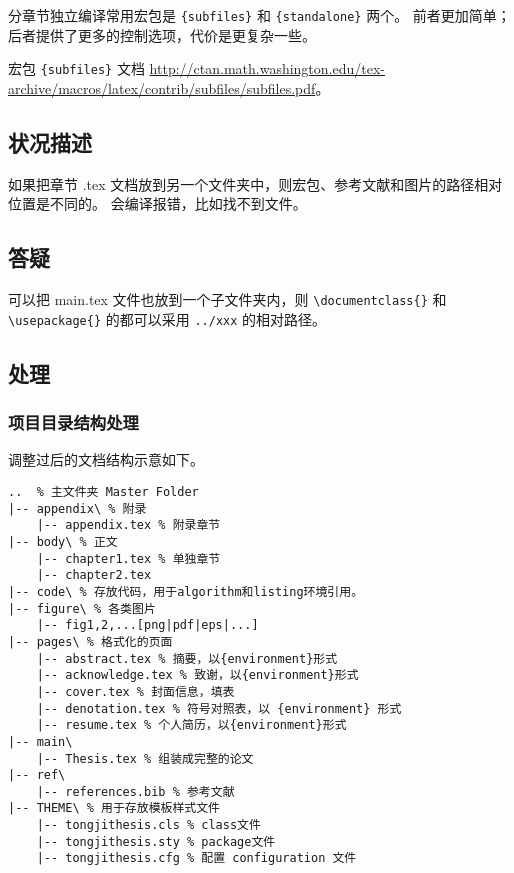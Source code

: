 \documentclass[../Main/thesis.tex]{subfiles}
\begin{document}
分章节独立编译常用宏包是 \texttt{\{subfiles\}} 和 \texttt{\{standalone\}} 两个。
前者更加简单；后者提供了更多的控制选项，代价是更复杂一些。

宏包 \texttt{\{subfiles\}} 文档
\url{http://ctan.math.washington.edu/tex-archive/macros/latex/contrib/subfiles/subfiles.pdf}。

\subsection{状况描述}

如果把章节 .tex 文档放到另一个文件夹中，则宏包、参考文献和图片的路径相对位置是不同的。
会编译报错，比如找不到文件。

\subsection{答疑}

可以把 main.tex 文件也放到一个子文件夹内，则 \texttt{\textbackslash{}documentclass\{\}} 和 \texttt{\textbackslash{}usepackage\{\}} 的都可以采用 \texttt{../xxx} 的相对路径。

\subsection{处理}

\subsubsection{项目目录结构处理}

调整过后的文档结构示意如下。

\begin{verbatim}
..  % 主文件夹 Master Folder
|-- appendix\ % 附录
    |-- appendix.tex % 附录章节
|-- body\ % 正文
    |-- chapter1.tex % 单独章节
    |-- chapter2.tex
|-- code\ % 存放代码，用于algorithm和listing环境引用。
|-- figure\ % 各类图片
    |-- fig1,2,...[png|pdf|eps|...]
|-- pages\ % 格式化的页面
    |-- abstract.tex % 摘要，以{environment}形式
    |-- acknowledge.tex % 致谢，以{environment}形式
    |-- cover.tex % 封面信息，填表
    |-- denotation.tex % 符号对照表，以 {environment} 形式
    |-- resume.tex % 个人简历，以{environment}形式
|-- main\
    |-- Thesis.tex % 组装成完整的论文
|-- ref\
    |-- references.bib % 参考文献
|-- THEME\ % 用于存放模板样式文件
    |-- tongjithesis.cls % class文件
    |-- tongjithesis.sty % package文件
    |-- tongjithesis.cfg % 配置 configuration 文件
\end{verbatim}
\end{document}
